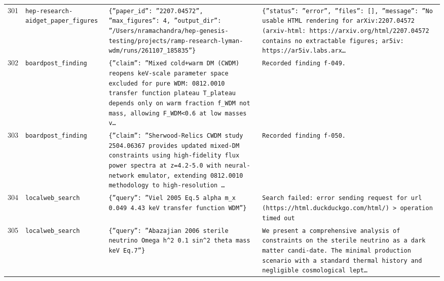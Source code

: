 \documentclass[11pt,a4paper]{article}
\begin{document}
\begin{longtable}{@{}p{}p{}p{}p{}@{}}
301 & \texttt{hep-research-aid}\newline\texttt{get\_\allowbreak{}paper\_\allowbreak{}figures} & \texttt{\{''paper\_\allowbreak{}id'':\allowbreak{} ''2207.04572'',\allowbreak{} ''max\_\allowbreak{}figures'':\allowbreak{} 4,\allowbreak{} ''output\_\allowbreak{}dir'':\allowbreak{} ''/\allowbreak{}Users/\allowbreak{}nramachandra/\allowbreak{}hep-genesis-testing/\allowbreak{}projects/\allowbreak{}ramp-research-lyman-wdm/\allowbreak{}runs/\allowbreak{}261107\_\allowbreak{}185835''\}\allowbreak{}} & \texttt{\{''status'':\allowbreak{} ''error'',\allowbreak{} ''files'':\allowbreak{} []\allowbreak{},\allowbreak{} ''message'':\allowbreak{} ''No usable HTML rendering for arXiv:\allowbreak{}2207.04572 (arxiv-html:\allowbreak{} https:\allowbreak{}/\allowbreak{}/\allowbreak{}arxiv.org/\allowbreak{}html/\allowbreak{}2207.04572 contains no extractable figures;\allowbreak{} ar5iv:\allowbreak{} https:\allowbreak{}/\allowbreak{}/\allowbreak{}ar5iv.labs.arx\ldots{}\allowbreak{}} \\
302 & \texttt{board}\newline\texttt{post\_\allowbreak{}finding} & \texttt{\{''claim'':\allowbreak{} ''Mixed cold+warm DM (CWDM)\allowbreak{} reopens keV-scale parameter space excluded for pure WDM:\allowbreak{} 0812.0010 transfer function plateau T\_\allowbreak{}plateau depends only on warm fraction f\_\allowbreak{}WDM not mass,\allowbreak{} allowing F\_\allowbreak{}WDM\textless{}\allowbreak{}0.6 at low masses v\ldots{}\allowbreak{}} & \texttt{Recorded finding f-049.} \\
303 & \texttt{board}\newline\texttt{post\_\allowbreak{}finding} & \texttt{\{''claim'':\allowbreak{} ''Sherwood-Relics CWDM study 2504.06367 provides updated mixed-DM constraints using high-fidelity flux power spectra at z=\allowbreak{}4.2-5.0 with neural-network emulator,\allowbreak{} extending 0812.0010 methodology to high-resolution \ldots{}\allowbreak{}} & \texttt{Recorded finding f-050.} \\
304 & \texttt{local}\newline\texttt{web\_\allowbreak{}search} & \texttt{\{''query'':\allowbreak{} ''Viel 2005 Eq.5 alpha m\_\allowbreak{}x 0.049 4.43 keV transfer function WDM''\}\allowbreak{}} & \texttt{Search failed:\allowbreak{} error sending request for url (https:\allowbreak{}/\allowbreak{}/\allowbreak{}html.duckduckgo.com/\allowbreak{}html/\allowbreak{})\allowbreak{} \textgreater{}\allowbreak{} operation timed out} \\
305 & \texttt{local}\newline\texttt{web\_\allowbreak{}search} & \texttt{\{''query'':\allowbreak{} ''Abazajian 2006 sterile neutrino Omega h\textasciicircum{}\allowbreak{}2 0.1 sin\textasciicircum{}\allowbreak{}2 theta mass keV Eq.7''\}\allowbreak{}} & \texttt{We present a comprehensive analysis of constraints on the sterile neutrino as a dark matter candi-date. The minimal production scenario with a standard thermal history and negligible cosmological lept\ldots{}\allowbreak{}} \\

\end{longtable}
\end{document}
